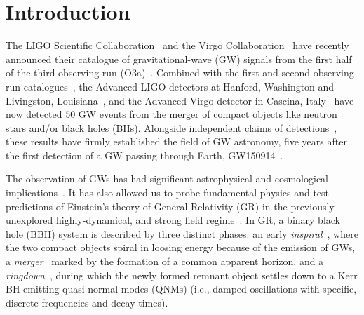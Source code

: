 \documentclass[twocolumn,prd,aps,superscriptaddress,preprintnumbers,tightenlines,showpacs,nofootinbib,eqsecnum,amsfonts,amsmath]{revtex4-1}
\begin{document}
\maketitle

\section{Introduction}
\label{sec:intro}
The LIGO Scientific Collaboration~\cite{lsc} and the Virgo
Collaboration~\cite{Virgo} have recently announced their catalogue of
gravitational-wave (GW) signals from the first
half of the third observing run (O3a)~\cite{Abbott:2020niy}. Combined
with the first and second observing-run catalogues~\cite{LIGOScientific:2018mvr}, the Advanced LIGO detectors at Hanford,
Washington and Livingston, Louisiana~\cite{TheLIGOScientific:2014jea},
and the Advanced Virgo detector in Cascina,
Italy~\cite{TheVirgo:2014hva} have now detected $50$ GW
events from the merger of compact objects like neutron stars and/or
black holes (BHs). Alongside independent claims of
detections~\cite{Nitz:2018imz,Nitz:2019hdf,Venumadhav:2019lyq,Zackay:2019btq}, these results have firmly established the field of GW astronomy, five years after the first detection of a GW passing through Earth, GW150914~\cite{Abbott:2016blz}.

The observation of GWs has had significant astrophysical and cosmological
implications~\cite{TheLIGOScientific:2016htt,GBM:2017lvd,Monitor:2017mdv,Abbott:2017xzu}. It
has also allowed us to probe fundamental
physics and test predictions of Einstein's theory of General Relativity
(GR) in the previously unexplored highly-dynamical, and strong field
regime~\cite{TheLIGOScientific:2016src,Abbott:2018lct,LIGOScientific:2019fpa,Abbott:2020jks}. In GR, a binary black hole (BBH) system is described by
three distinct phases: an early \textit{inspiral}~\cite{Blanchet:2013haa}, where the two
compact objects spiral in loosing energy because of the emission of GWs, a \textit{merger}~\cite{Pretorius:2005gq,Campanelli:2005dd,Baker:2005vv} marked by the
formation of a common apparent horizon, and a \textit{ringdown}~\cite{Vishveshwara:1970zz,Vishveshwara:1970cc,Press:1971wr,Chandrasekhar:1975zza,Detweiler:1980gk}, during which the newly formed remnant object settles down to a Kerr BH emitting quasi-normal-modes (QNMs) (i.e., damped oscillations with specific, discrete frequencies and decay times).
\end{document}

